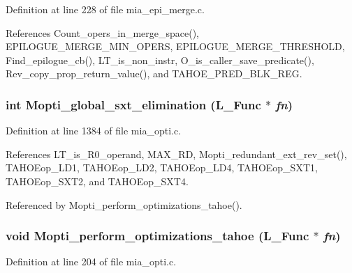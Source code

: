 Definition at line 228 of file mia\_\-epi\_\-merge.c.

References Count\_\-opers\_\-in\_\-merge\_\-space(), EPILOGUE\_\-MERGE\_\-MIN\_\-OPERS, EPILOGUE\_\-MERGE\_\-THRESHOLD, Find\_\-epilogue\_\-cb(), LT\_\-is\_\-non\_\-instr, O\_\-is\_\-caller\_\-save\_\-predicate(), Rev\_\-copy\_\-prop\_\-return\_\-value(), and TAHOE\_\-PRED\_\-BLK\_\-REG.
\subsubsection{\setlength{\rightskip}{0pt plus 5cm}int Mopti\_\-global\_\-sxt\_\-elimination (L\_\-Func $\ast$ {\em fn})}\label{mia__opti_8h_258d13a44eb860f3f27738a61d97f914}




Definition at line 1384 of file mia\_\-opti.c.

References LT\_\-is\_\-R0\_\-operand, MAX\_\-RD, Mopti\_\-redundant\_\-ext\_\-rev\_\-set(), TAHOEop\_\-LD1, TAHOEop\_\-LD2, TAHOEop\_\-LD4, TAHOEop\_\-SXT1, TAHOEop\_\-SXT2, and TAHOEop\_\-SXT4.

Referenced by Mopti\_\-perform\_\-optimizations\_\-tahoe().
\subsubsection{\setlength{\rightskip}{0pt plus 5cm}void Mopti\_\-perform\_\-optimizations\_\-tahoe (L\_\-Func $\ast$ {\em fn})}\label{mia__opti_8h_b608d83646fb9d2a6cb3198df341cb05}




Definition at line 204 of file mia\_\-opti.c.

